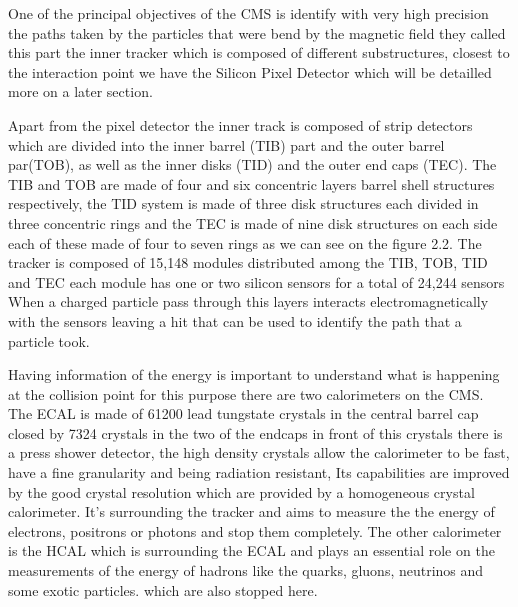 One of the principal objectives of the CMS is identify with very high precision the paths taken by the particles that were bend by the magnetic field they called this part the inner tracker which is composed of different substructures, closest to the interaction point we have the Silicon Pixel Detector which will be detailled more on a later section.

Apart from the pixel detector the inner track is composed of strip detectors which are divided into the inner barrel (TIB) part and the outer barrel par(TOB), as well as the inner disks (TID) and the outer end caps (TEC). The TIB and TOB are made of four and six concentric layers barrel shell structures respectively, the TID system is made of three disk structures each divided in three concentric rings and the TEC is made of nine disk structures on each side each of these made of four to seven rings as we can see on the figure 2.2. The tracker is composed of 15,148 modules distributed among the TIB, TOB, TID and TEC each module has one or two silicon sensors for a total of 24,244 sensors  When a charged particle pass through this layers interacts electromagnetically with the sensors leaving a hit that can be used to identify the path that a particle took. \cite{CMS1}



Having information of the energy is important to understand what is happening at the collision point for this purpose there are two calorimeters on the CMS. The ECAL is made of 61200 lead tungstate crystals in the central barrel cap closed by 7324 crystals in the two of the endcaps in front of this crystals there is a press shower detector, the high density crystals allow  the calorimeter to be fast, have a fine granularity and being radiation resistant, Its capabilities are improved by the good crystal resolution which are provided by a homogeneous crystal calorimeter. It's surrounding the tracker and aims to measure the the energy of electrons, positrons or photons and stop them completely. The other calorimeter is the HCAL which is surrounding the ECAL and plays an essential role on the measurements of the energy of hadrons like the quarks, gluons, neutrinos and some exotic particles. which are also stopped here.  


